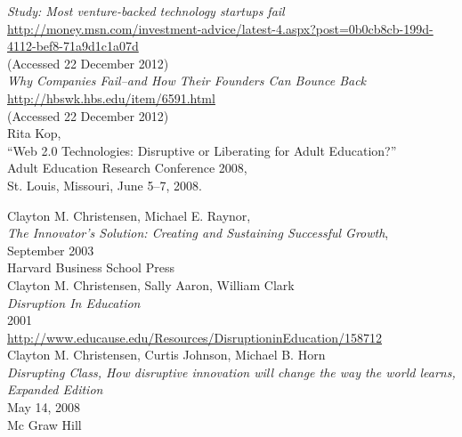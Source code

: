 \documentclass[a4paper,10pt]{article}
\begin{document}
\begin{thebibliography}{9}




  \emph{Study: Most venture-backed technology startups fail }\\
  \url{http://money.msn.com/investment-advice/latest-4.aspx?post=0b0cb8cb-199d-4112-bef8-71a9d1c1a07d}\\
  (Accessed 22 December 2012)\\
  
  
  
  \emph{Why Companies Fail--and How Their Founders Can Bounce Back}\\
  \url{http://hbswk.hbs.edu/item/6591.html}\\
  (Accessed 22 December 2012)\\
  

  Rita Kop, \\
  “Web 2.0 Technologies: Disruptive or Liberating for Adult Education?” \\
  Adult Education Research Conference 2008, \\
  St. Louis, Missouri, June 5–7, 2008.

   Clayton M. Christensen, Michael E. Raynor,\\
   \emph{The Innovator's Solution: Creating and Sustaining Successful Growth},\\
   September 2003 \\
   Harvard Business School Press\\
 
   Clayton M. Christensen, Sally Aaron, William Clark\\
   \emph{Disruption In Education}\\
    2001\\
   \url{http://www.educause.edu/Resources/DisruptioninEducation/158712}\\

    
   Clayton M. Christensen, Curtis Johnson, Michael B. Horn\\
   \emph{Disrupting Class, How disruptive innovation will change the way the world learns, Expanded Edition}\\
    May 14, 2008\\
    Mc Graw Hill\\


\end{thebibliography}
\end{document}
